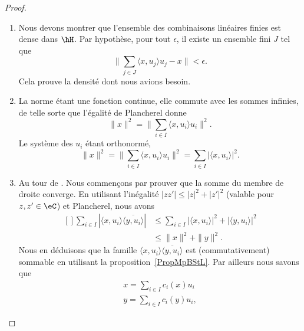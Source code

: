 \begin{proof}
\begin{enumerate}
        \item
            Nous devons montrer que l'ensemble des combinaisons linéaires finies est dense dans \( \hH\). Par hypothèse, pour tout \( \epsilon\), il existe un ensemble fini \( J\) tel que
            \begin{equation}
                \| \sum_{j\in J}\langle x, u_j\rangle u_j-x \|<\epsilon.
            \end{equation}
            Cela prouve la densité dont nous avions besoin.
        \item
            La norme étant une fonction continue, elle commute avec les sommes infinies, de telle sorte que l'égalité de Plancherel donne
            \begin{equation}
                \| x \|^2=\| \sum_{i\in I}\langle x, u_i\rangle u_i \|^2.
            \end{equation}
            Le système des \( u_i\) étant orthonormé,
            \begin{equation}
                \| x \|^2=\| \sum_{i\in I}\langle x, u_i\rangle u_i \|^2=\sum_{i\in I}| \langle x, u_i\rangle  |^2.
            \end{equation}
        \item
            Au tour de . Nous commençons par prouver que la somme du membre de droite converge. En utilisant l'inégalité \( | zz' |\leq | z |^2+| z' |^2\) (valable pour \( z,z'\in \eC\)) et Plancherel, nous avons
            \begin{equation}
                \begin{aligned}[]
                    \sum_{i\in I}| \langle x, u_i\rangle \overline{ \langle y, u_i\rangle  } |&\leq\sum_{i\in I}| \langle x, u_i\rangle  |^2+| \langle y, u_i\rangle  |^2\\
                    &\leq \| x \|^2+\| y \|^2.
                \end{aligned}
            \end{equation}
            Nous en déduisons que la famille \( \langle x, u_i\rangle \overline{ \langle y, u_i\rangle  }\) est (commutativement) sommable en utilisant la proposition~\ref{PropMpBStL}. Par ailleurs nous savons que
            \begin{subequations}
                \begin{align}
                    x=\sum_{i\in I}c_i(x)u_i\\
                    y=\sum_{i\in I}c_i(y)u_i,
                \end{align}

\end{subequations}
\end{enumerate}
\end{proof}
